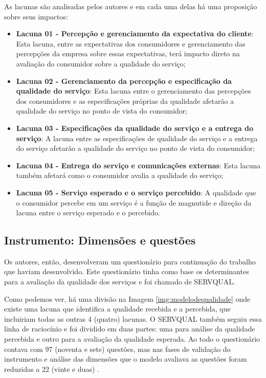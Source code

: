 As lacunas são analisadas pelos autores e em cada uma delas há uma proposição sobre seus impactos:
\begin{itemize}
	\item \textbf{Lacuna 01 - Percepção e gerenciamento da expectativa do cliente}: Esta lacuna, entre as expectativas dos consumidores e gerenciamento das percepções da empresa sobre essas expectativas, terá impacto direto na avaliação do consumidor sobre a qualidade do serviço;
	\item \textbf{Lacuna 02 - Gerenciamento da percepção e especificação da qualidade do serviço}: Esta lacuna entre o gerenciamento das percepções dos consumidores e as especificações próprias da qualidade afetarão a qualidade do serviço no ponto de vista do consumidor;
	\item \textbf{Lacuna 03 - Especificações da qualidade do serviço e a entrega do serviço}: A lacuna entre as especificações de qualidade do serviço e a entrega do serviço afetarão a qualidade do serviço no ponto de vista do consumidor;
	\item \textbf{Lacuna 04 - Entrega do serviço e comunicações externas}: Esta lacuna também afetará como o consumidor avalia a qualidade do serviço;
	\item \textbf{Lacuna 05 - Serviço esperado e o serviço percebido}: A qualidade que o consumidor percebe em um serviço é a função de magnutide e direção da lacuna entre o serviço esperado e o percebido.
\end{itemize}

\subsection{Instrumento: Dimensões e questões}
Os autores, então, desenvolveram um questionário para continuação do trabalho que haviam desenvolvido. Este questionário tinha como base os determinantes para a avaliação da qualidade dos serviços e foi chamado de SERVQUAL. 

Como podemos ver, há uma divisão na Imagem \ref{img:modelodequalidade} onde existe uma lacuna que identifica a qualidade recebida e a percebida, que incluiriam todas as outras 4 (quatro) lacunas. O SERVQUAL também seguiu essa linha de raciocínio e foi dividido em duas partes: uma para análise da qualidade percebida e outro para a avaliação da qualidade esperada. Ao todo o questionário contava com 97 (noventa e sete) questões, mas nas fases de validação do instrumento e análise das dimensões que o modelo avaliava as questões foram reduzidas a 22 (vinte e duas) \cite{parasuraman1988}.


